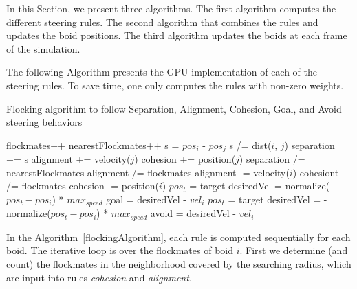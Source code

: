 In this Section, we present three algorithms.  
The first algorithm computes the different steering rules. The second algorithm
that combines the rules and updates the boid positions. The third algorithm
updates the boids at each frame of the simulation. 


The following Algorithm presents the GPU implementation of each of the 
steering rules. To save time, one only computes the rules with non-zero
weights. 

\begin{algorithm}
\caption{Flocking algorithm to follow Separation, Alignment, Cohesion, Goal, and Avoid steering behaviors}
\label{flockingAlgorithm}
\begin{algorithmic}
	\STATE flockmates++
				\STATE nearestFlockmates++
				\STATE s = $pos_i$ - $pos_j$ 
				\STATE s /= dist($i$, $j$) 
				\STATE separation += s
			\ENDIF
		\ENDIF
			\STATE alignment += velocity($j$)
		\ENDIF
			\STATE cohesion += position($j$)
		\ENDIF
	\ENDIF
\ENDFOR
{}
	\STATE separation /= nearestFlockmates
\ENDIF
{}
	\STATE alignment /=  flockmates
	\STATE alignment -= velocity($i$)
\ENDIF
{}
	\STATE cohesiont /=  flockmates
	\STATE cohesion -= position($i$)
\ENDIF
{}
	\STATE $pos_t$ = target
	\STATE desiredVel = normalize($pos_t - pos_i$) * $max_{speed}$
	\STATE goal = desiredVel - $vel_i$
\ENDIF
{}
	\STATE $pos_t$ = target
	\STATE desiredVel = -normalize($pos_t - pos_i$) * $max_{speed}$
	\STATE avoid = desiredVel - $vel_i$
\ENDIF

\end{algorithmic}
\end{algorithm}

In the Algorithm~\ref{flockingAlgorithm}, each rule is computed sequentially for each boid. 
The iterative loop is over the flockmates of boid $i$. 
First we determine (and count) the flockmates in the neighborhood covered
by the searching radius, which are input into 
rules \textit{cohesion} and \textit{alignment}. 

